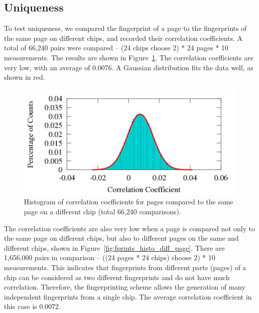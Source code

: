 \subsection{Uniqueness}

To test uniqueness, we compared the fingerprint of a page to the fingerprints of the same page on different chips, and recorded their correlation coefficients. A total of 66,240 pairs were compared – (24 chips choose 2) * 24 pages * 10 measurements. The results are shown in Figure~\ref{fig:fprints_histo_diff_chip}. The correlation coefficients are very low, with an average of 0.0076. A Gaussian distribution fits the data well, as shown in red.

\begin{figure}
\begin{center} 
\includegraphics[width=\mywidth]{figs/fprints_histo_diff_chip.png} 
\caption{Histogram of correlation coefficients for pages compared to the same page on a different chip (total 66,240 comparisons).}
\label{fig:fprints_histo_diff_chip} 
\vspace{-0.1in}
\end{center} 
\end{figure} 

The correlation coefficients are also very low when a page is compared not only to the same page on different chips, but also to different pages on the same and different chips, shown in Figure~\ref{fig:fprints_histo_diff_page}. There are 1,656,000 pairs in comparison – ((24 pages * 24 chips) choose 2) * 10 measurements. This indicates that fingerprints from different parts (pages) of a chip can be considered as two different fingerprints and do not have much correlation. Therefore, the fingerprinting scheme allows the generation of many independent fingerprints from a single chip. The average correlation coefficient in this case is 0.0072.


